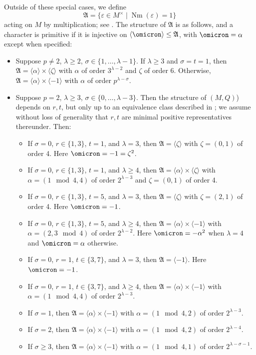 \documentclass[a4paper,11pt]{report}
\begin{document}
{{{ Outside of these special cases, we define
\[\mathfrak{A} = \{\varepsilon \in M^\times \mid \operatorname{Nm}(\varepsilon)
= 1 \}\]
 acting on $M$ by multiplication; see \cite[Section 2.3 - 2.4]{NW76}. The structure of $\mathfrak{A}$ is as follows, and a character is primitive if it is injective on $\langle\omicron\rangle \leq \mathfrak{A}$, with $\omicron = \alpha$ except when specified:
\begin{itemize}
\item Suppose $p \neq 2$, $\lambda \geq 2$, $\sigma \in \{1, \dots, \lambda - 1\}$. If $\lambda \geq 3$ and $\sigma=t=1$, then $\mathfrak{A} = \langle\alpha\rangle \times \langle\zeta\rangle$ with $\alpha$ of order $3^{\lambda-2}$ and $\zeta$ of order 6. Otherwise, $\mathfrak{A} = \langle\alpha\rangle \times \langle-1\rangle$ with $\alpha$ of order $p^{\lambda - \sigma}$.
\item Suppose $p=2$, $\lambda \geq 3$, $\sigma \in \{0, \dots, \lambda - 3\}$. Then the structure of $(M,Q)$) depends on $r,t$, but only up to an equivalence class described in \cite[Satz 4]{Nobs1}; we assume without loss of generality that $r,t$ are minimal positive representatives thereunder. Then:
\begin{itemize}
\item If $\sigma = 0$, $r \in \{1,3\}$, $t=1$, and $\lambda = 3$, then $\mathfrak{A} = \langle\zeta\rangle$ with $\zeta = (0,1)$ of order 4. Here $\omicron = -1 = \zeta^2$.
\item If $\sigma = 0$, $r \in \{1,3\}$, $t=1$, and $\lambda \geq 4$, then $\mathfrak{A} = \langle\alpha\rangle \times \langle\zeta\rangle$ with $\alpha = (1 \mod{4},4)$ of order $2^{\lambda-3}$ and $\zeta = (0,1)$ of order 4.
\item If $\sigma = 0$, $r \in \{1,3\}$, $t=5$, and $\lambda = 3$, then $\mathfrak{A} = \langle\zeta\rangle$ with $\zeta = (2,1)$ of order 4. Here $\omicron = -1$.
\item If $\sigma = 0$, $r \in \{1,3\}$, $t=5$, and $\lambda \geq 4$, then $\mathfrak{A} = \langle\alpha\rangle \times \langle-1\rangle$ with $\alpha = (2,3 \mod{4})$ of order $2^{\lambda-2}$. Here $\omicron = -\alpha^2$ when $\lambda = 4$ and $\omicron = \alpha$ otherwise.
\item If $\sigma = 0$, $r = 1$, $t \in \{3,7\}$, and $\lambda = 3$, then $\mathfrak{A} = \langle-1\rangle$. Here $\omicron = -1$.
\item If $\sigma = 0$, $r = 1$, $t \in \{3,7\}$, and $\lambda \geq 4$, then $\mathfrak{A} = \langle\alpha\rangle \times \langle-1\rangle$ with $\alpha = (1 \mod{4},4)$ of order $2^{\lambda-3}$.
\item If $\sigma = 1$, then $\mathfrak{A} = \langle\alpha\rangle \times \langle-1\rangle$ with $\alpha = (1 \mod{4},2)$ of order $2^{\lambda-3}$.
\item If $\sigma = 2$, then $\mathfrak{A} = \langle\alpha\rangle \times \langle-1\rangle$ with $\alpha = (1 \mod{4},2)$ of order $2^{\lambda-4}$.
\item If $\sigma \geq 3$, then $\mathfrak{A} = \langle\alpha\rangle \times \langle-1\rangle$ with $\alpha = (1 \mod{4},1)$ of order $2^{\lambda-\sigma-1}$.
\end{itemize}


\end{itemize}}}}
\end{document}
